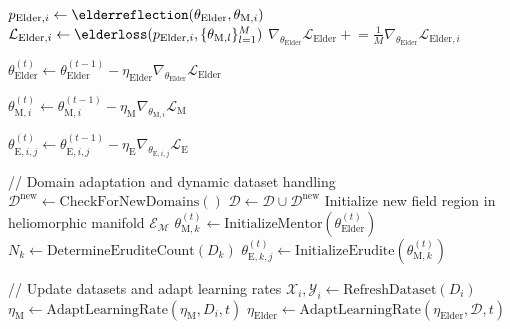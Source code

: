 \begin{algorithm}
\begin{algorithmic}[1]
        \State $p_{\text{Elder},i} \gets \elderreflection(\theta_{\text{Elder}}, \theta_{\text{M},i})$ 
        \State $\mathcal{L}_{\text{Elder},i} \gets \elderloss(p_{\text{Elder},i}, \{\theta_{\text{M},l}\}_{l=1}^{M})$ 
        \State $\nabla_{\theta_{\text{Elder}}} \mathcal{L}_{\text{Elder}} \mathrel{+}= \frac{1}{M} \nabla_{\theta_{\text{Elder}}} \mathcal{L}_{\text{Elder},i}$ 
    \EndFor
    
    \State $\theta_{\text{Elder}}^{(t)} \gets \theta_{\text{Elder}}^{(t-1)} - \eta_{\text{Elder}} \nabla_{\theta_{\text{Elder}}} \mathcal{L}_{\text{Elder}}$ 
    
        \State $\theta_{\text{M},i}^{(t)} \gets \theta_{\text{M},i}^{(t-1)} - \eta_{\text{M}} \nabla_{\theta_{\text{M},i}} \mathcal{L}_{\text{M}}$ 
        
            \State $\theta_{\text{E},i,j}^{(t)} \gets \theta_{\text{E},i,j}^{(t-1)} - \eta_{\text{E}} \nabla_{\theta_{\text{E},i,j}} \mathcal{L}_{\text{E}}$ 
        \EndFor
    \EndFor
    
    \State // Domain adaptation and dynamic dataset handling
    \State $\mathcal{D}^{\text{new}} \gets \text{CheckForNewDomains}()$ 
        \State $\mathcal{D} \gets \mathcal{D} \cup \mathcal{D}^{\text{new}}$ 
            \State Initialize new field region in heliomorphic manifold $\mathcal{E}_{\mathcal{M}}$
            \State $\theta_{\text{M},k}^{(t)} \gets \text{InitializeMentor}(\theta_{\text{Elder}}^{(t)})$ 
            \State $N_k \gets \text{DetermineEruditeCount}(D_k)$
                \State $\theta_{\text{E},k,j}^{(t)} \gets \text{InitializeErudite}(\theta_{\text{M},k}^{(t)})$ 
            \EndFor
        \EndFor
    \EndIf
    
    \State // Update datasets and adapt learning rates
        \State $\mathcal{X}_i, \mathcal{Y}_i \gets \text{RefreshDataset}(D_i)$ 
        \State $\eta_{\text{M}} \gets \text{AdaptLearningRate}(\eta_{\text{M}}, D_i, t)$
    \EndFor
    \State $\eta_{\text{Elder}} \gets \text{AdaptLearningRate}(\eta_{\text{Elder}}, \mathcal{D}, t)$
    

\end{algorithmic}
\end{algorithm}
